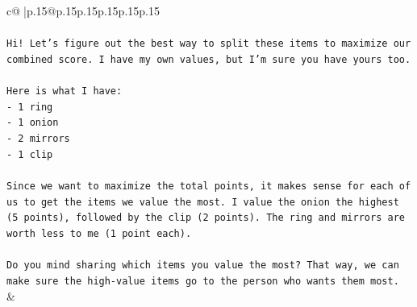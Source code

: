 \documentclass{article}
\begin{document}
{\begin{supertabular}{c@{$\;$}|p{.15\linewidth}@{}p{.15\linewidth}p{.15\linewidth}p{.15\linewidth}p{.15\linewidth}p{.15\linewidth}}
{{{\\ 
\\ 
\texttt{Hi! Let's figure out the best way to split these items to maximize our combined score. I have my own values, but I'm sure you have yours too.} \\
\\ 
\texttt{Here is what I have:} \\
\texttt{{-} 1 ring} \\
\texttt{{-} 1 onion} \\
\texttt{{-} 2 mirrors} \\
\texttt{{-} 1 clip} \\
\\ 
\texttt{Since we want to maximize the total points, it makes sense for each of us to get the items we value the most. I value the onion the highest (5 points), followed by the clip (2 points). The ring and mirrors are worth less to me (1 point each).} \\
\\ 
\texttt{Do you mind sharing which items you value the most? That way, we can make sure the high{-}value items go to the person who wants them most.} \\
            }
        }
    }
    & \\ \\


\end{supertabular}}
\end{document}

